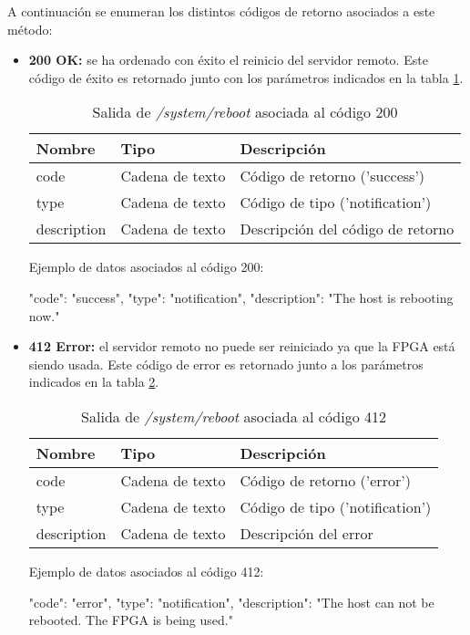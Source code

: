 A continuación se enumeran los distintos códigos de retorno asociados a este método:
\begin{itemize}

\item{\textbf{200 OK:} se ha ordenado con éxito el reinicio del servidor remoto. Este código de éxito es retornado junto con los parámetros indicados en la tabla \ref{extra:api:reboot:ok}.
\begin{table}[H]
\centering
\begin{tabular}{|l|l|l|}
\hline
\rowcolor[HTML]{F5F5F5}
\textbf{Nombre}  & \textbf{Tipo}   & \textbf{Descripción}              \\ \hline
code             & Cadena de texto & Código de retorno ('success')     \\ \hline
type             & Cadena de texto & Código de tipo ('notification')   \\ \hline
description      & Cadena de texto & Descripción del código de retorno \\ \hline
\end{tabular}
\caption{Salida de \textit{/system/reboot} asociada al código 200}
\label{extra:api:reboot:ok}
\end{table}
\begin{minipage}{\textwidth}
Ejemplo de datos asociados al código 200:

\begin{code}[language=json]
{
  "code": "success",
  "type": "notification",
  "description": "The host is rebooting now."
}
\end{code}
\end{minipage}
}

\item{\textbf{412 Error:} el servidor remoto no puede ser reiniciado ya que la \gls{FPGA} está siendo usada. Este código de error es retornado junto a los parámetros indicados en la tabla \ref{extra:api:reboot:error}.
\begin{table}[H]
\centering
\begin{tabular}{|l|l|l|}
\hline
\rowcolor[HTML]{F5F5F5}
\textbf{Nombre}  & \textbf{Tipo}   & \textbf{Descripción}            \\ \hline
code             & Cadena de texto & Código de retorno ('error')     \\ \hline
type             & Cadena de texto & Código de tipo ('notification') \\ \hline
description      & Cadena de texto & Descripción del error           \\ \hline
\end{tabular}
\caption{Salida de \textit{/system/reboot} asociada al código 412}
\label{extra:api:reboot:error}
\end{table}
\begin{minipage}{\textwidth}
Ejemplo de datos asociados al código 412:

\begin{code}[language=json]
{
  "code": "error",
  "type": "notification",
  "description": "The host can not be rebooted. The FPGA is being used."
}
\end{code}
\end{minipage}
}
\end{itemize}

